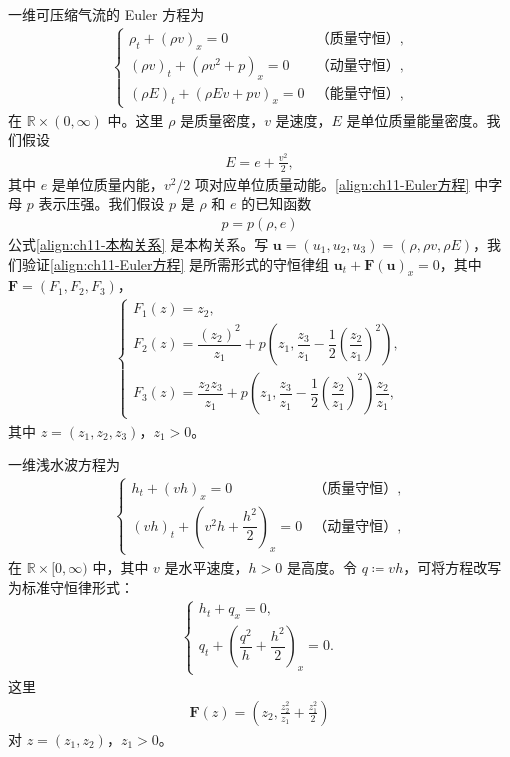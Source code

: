 \documentclass[../../main.tex]{subfiles}
\begin{document}
\begin{example}\label{example:ch11-Euler方程}
一维可压缩气流的 Euler 方程为
\begin{align}
\begin{cases}
\rho_t+(\rho v)_x=0 & \text{（质量守恒）},\\
(\rho v)_t+(\rho v^2+p)_x=0 & \text{（动量守恒）},\\
(\rho E)_t+(\rho Ev+pv)_x=0 & \text{（能量守恒）},
\end{cases}
\label{align:ch11-Euler方程}
\end{align}
在 $\mathbb{R}\times(0,\infty)$ 中。这里 $\rho$ 是质量密度，$v$ 是速度，$E$ 是单位质量能量密度。我们假设
\begin{align*}
E=e+\frac{v^2}{2},
\end{align*}
其中 $e$ 是单位质量内能，$v^2/2$ 项对应单位质量动能。\eqref{align:ch11-Euler方程} 中字母 $p$ 表示压强。我们假设 $p$ 是 $\rho$ 和 $e$ 的已知函数
\begin{align}
p=p(\rho,e)
\label{align:ch11-本构关系}
\end{align}
公式\eqref{align:ch11-本构关系} 是本构关系。写 $\mathbf{u}=(u_1,u_2,u_3)=(\rho,\rho v,\rho E)$，我们验证\eqref{align:ch11-Euler方程} 是所需形式的守恒律组 $\mathbf{u}_t+\mathbf{F}(\mathbf{u})_x=0$，其中 $\mathbf{F}=(F_1,F_2,F_3)$，
\begin{align}
\begin{cases}
F_1(z)=z_2,\\
F_2(z)=\dfrac{(z_2)^2}{z_1}+p\left(z_1,\dfrac{z_3}{z_1}-\dfrac{1}{2}\left(\dfrac{z_2}{z_1}\right)^2\right),\\
F_3(z)=\dfrac{z_2 z_3}{z_1}+p\left(z_1,\dfrac{z_3}{z_1}-\dfrac{1}{2}\left(\dfrac{z_2}{z_1}\right)^2\right)\dfrac{z_2}{z_1},
\end{cases}
\label{align:ch11-Euler通量}
\end{align}
其中 $z=(z_1,z_2,z_3)$，$z_1>0$。
\end{example}

\begin{example}\label{example:ch11-浅水波方程}
一维浅水波方程为
\begin{align*}
\begin{cases}
h_t+(vh)_x=0 & \text{（质量守恒）},\\
(vh)_t+\left(v^2h+\dfrac{h^2}{2}\right)_x=0 & \text{（动量守恒）},
\end{cases}
\end{align*}
在 $\mathbb{R}\times[0,\infty)$ 中，其中 $v$ 是水平速度，$h>0$ 是高度。令 $q\coloneqq vh$，可将方程改写为标准守恒律形式：
\begin{align*}
\begin{cases}
h_t+q_x=0,\\
q_t+\left(\dfrac{q^2}{h}+\dfrac{h^2}{2}\right)_x=0.
\end{cases}
\end{align*}
这里
\begin{align*}
\mathbf{F}(z)=\left(z_2,\frac{z_2^2}{z_1}+\frac{z_1^2}{2}\right)
\end{align*}
对 $z=(z_1,z_2)$，$z_1>0$。
\end{example}
\end{document}
